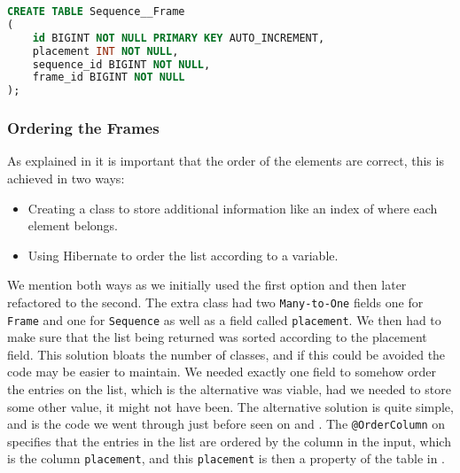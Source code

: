 \begin{lstlisting}[float, floatplacement=H, language=SQL, caption={The table creation of the join table between \texttt{Sequence} and \texttt{Frame}.},label={lst:sql-frame-sequence}]
CREATE TABLE Sequence__Frame
(
    id BIGINT NOT NULL PRIMARY KEY AUTO_INCREMENT,
    placement INT NOT NULL,
    sequence_id BIGINT NOT NULL,
    frame_id BIGINT NOT NULL
);
\end{lstlisting}

\subsubsection{Ordering the Frames}\label{ss:order}
As explained in  it is important that the order of the elements are correct, this is achieved in two ways:
\begin{itemize}
	\item Creating a class to store additional information like an index of where each element belongs.
	\item Using Hibernate to order the list according to a variable.
\end{itemize}

We mention both ways as we initially used the first option and then later refactored to the second.
The extra class had two \texttt{Many-to-One} fields one for \texttt{Frame} and one for \texttt{Sequence} as well as a field called \texttt{placement}.
We then had to make sure that the list being returned was sorted according to the placement field.
This solution bloats the number of classes, and if this could be avoided the code may be easier to maintain.
We needed exactly one field to somehow order the entries on the list, which is the alternative was viable, had we needed to store some other value, it might not have been.
The alternative solution is quite simple, and is the code we went through just before seen on  and .
The \texttt{@OrderColumn} on  specifies that the entries in the list are ordered by the column in the input, which is the column \texttt{placement}, and this \texttt{placement} is then a property of the table in .
